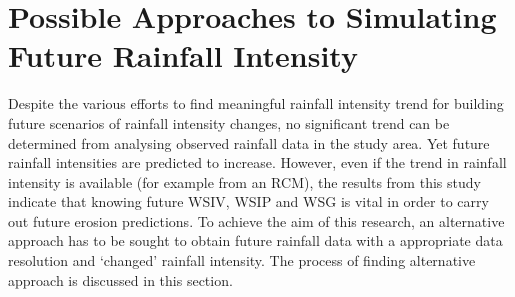 

\section{Possible Approaches to Simulating Future Rainfall Intensity}
\label{sec:ProposedSimulationMethods}

Despite the various efforts to find meaningful rainfall intensity trend for
building future scenarios of rainfall intensity changes, no significant trend
can be determined from analysing observed rainfall data in the study area.
Yet future rainfall intensities are predicted to increase.
However, even if the trend in rainfall intensity is available (for
example from an RCM), the results from this study indicate that knowing future
WSIV, WSIP and WSG is vital in order to carry out future erosion predictions. To
achieve the aim of this research, an alternative approach has to be sought to
obtain future rainfall data with a appropriate data resolution and
`changed' rainfall intensity. The process of finding alternative approach is
discussed in this section.




